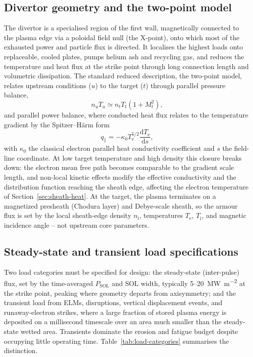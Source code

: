 \subsection{Divertor geometry and the two-point model}

The divertor is a specialised region of the first wall, magnetically connected to the plasma edge via a poloidal field null (the X-point), onto which most of the exhausted power and particle flux is directed. It localises the highest loads onto replaceable, cooled plates, pumps helium ash and recycling gas, and reduces the temperature and heat flux at the strike point through long connection length and volumetric dissipation. The standard reduced description, the two-point model, relates upstream conditions ($u$) to the target ($t$) through parallel pressure balance,
\begin{equation}
n_{u} T_{u} \simeq n_{t} T_{t} \left(1 + M_{t}^{2}\right),
\label{eq:twopoint-pressure}
\end{equation}
and parallel power balance, where conducted heat flux relates to the temperature gradient by the Spitzer--Härm form
\begin{equation}
q_{\parallel} = -\kappa_{0} T_{\mathrm{e}}^{5/2} \frac{\mathrm{d}T_{\mathrm{e}}}{\mathrm{d}s},
\label{eq:spitzer}
\end{equation}
with $\kappa_{0}$ the classical electron parallel heat conductivity coefficient and $s$ the field-line coordinate. At low target temperature and high density this closure breaks down: the electron mean free path becomes comparable to the gradient scale length, and non-local kinetic effects modify the effective conductivity and the distribution function reaching the sheath edge, affecting the electron temperature of Section~\ref{sec:sheath-heat}. At the target, the plasma terminates on a magnetized presheath (Chodura layer) and Debye-scale sheath, so the armour flux is set by the local sheath-edge density $n_{\mathrm{i}}$, temperatures $T_{\mathrm{e}}$, $T_{\mathrm{i}}$, and magnetic incidence angle -- not upstream core parameters.

\subsection{Steady-state and transient load specifications}

Two load categories must be specified for design: the steady-state (inter-pulse) flux, set by the time-averaged $P_{\mathrm{SOL}}$ and SOL width, typically \SI{5}{}--\SI{20}{MW.m^{-2}} at the strike point, peaking where geometry departs from axisymmetry; and the transient load from ELMs, disruptions, vertical displacement events, and runaway-electron strikes, where a large fraction of stored plasma energy is deposited on a millisecond timescale over an area much smaller than the steady-state wetted area. Transients dominate the erosion and fatigue budget despite occupying little operating time. Table~\ref{tab:load-categories} summarises the distinction.

